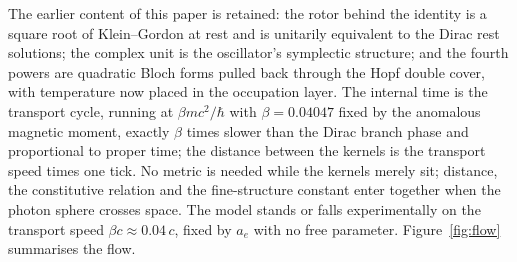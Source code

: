 \documentclass[%
 reprint, amsmath,amssymb, aps, prb, ]{revtex4-2}
\numberwithin{equation}{section}
\begin{document}
The earlier content of this paper is retained: the rotor behind the identity is a square root of Klein--Gordon at rest and is unitarily equivalent to the Dirac rest solutions; the complex unit is the oscillator's symplectic structure; and the fourth powers are quadratic Bloch forms pulled back through the Hopf double cover, with temperature now placed in the occupation layer. The internal time is the transport cycle, running at $\beta mc^2/\hbar$ with $\beta=0.04047$ fixed by the anomalous magnetic moment, exactly $\beta$ times slower than the Dirac branch phase and proportional to proper time; the distance between the kernels is the transport speed times one tick. No metric is needed while the kernels merely sit; distance, the constitutive relation and the fine-structure constant enter together when the photon sphere crosses space. The model stands or falls experimentally on the transport speed $\beta c\approx0.04\,c$, fixed by $a_e$ with no free parameter. Figure~\ref{fig:flow} summarises the flow.
\end{document}

